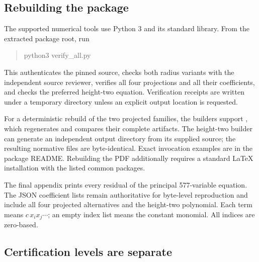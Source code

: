 \subsection{Rebuilding the package}

The supported numerical tools use Python 3 and its standard library. From the extracted package root, run
\begin{quote}\ttfamily\small
python3 verify\_all.py
\end{quote}
This authenticates the pinned source, checks both radius variants with the independent source reviewer, verifies all four projections and all their coefficients, and checks the preferred height-two equation. Verification receipts are written under a temporary directory unless an explicit output location is requested.

For a deterministic rebuild of the two projected families, the builders support , which regenerates and compares their complete artifacts. The height-two builder can generate an independent output directory from its supplied source; the resulting normative files are byte-identical. Exact invocation examples are in the package README. Rebuilding the PDF additionally requires a standard LaTeX installation with the listed common packages.

The final appendix prints every residual of the principal 577-variable equation. The JSON coefficient lists remain authoritative for byte-level reproduction and include all four projected alternatives and the height-two polynomial. Each term \code{[c,[i,j,...]]} means \(c\,x_ix_j\cdots\); an empty index list means the constant monomial. All indices are zero-based.

\subsection{Certification levels are separate}

